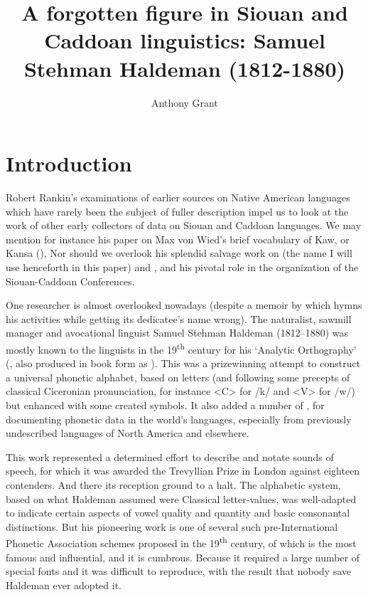 \documentclass[output=paper]{LSP/langsci}
\author{Anthony Grant}
\title{A forgotten figure in {Siouan} and {Caddoan} linguistics:  {Samuel Stehman Haldeman} (1812-1880)}
\begin{document}
\section{Introduction}

 
Robert Rankin's examinations of earlier sources on Native American languages which have rarely been the subject of fuller description impel us to look at the work of other early collectors of data on Siouan and Caddoan languages. We may mention for instance his paper on Max von Wied's \citeyearpar{Maximilian18391841} brief vocabulary of Kaw,  or Kansa  (\citealt{Rankin1994}), Nor should we overlook his splendid salvage work on  (the name I will use henceforth in this paper) and , and his pivotal role in the organization of the Siouan-Caddoan Conferences.
 

One researcher is almost overlooked nowadays (despite a memoir by \citealt{Lesley1881} which hymns his activities while getting its dedicatee's name wrong). The naturalist, sawmill manager and avocational linguist Samuel Stehman Haldeman (1812--1880)  was mostly known to the linguists in the 19\textsuperscript{th} century for his `Analytic Orthography' (\citealt{Haldeman1859}, also produced in book form as \citealt{Haldeman1860}). This was a prizewinning attempt to construct a  universal phonetic alphabet, based on  letters (and following some precepts of classical Ciceronian  pronunciation, for instance <C> for /k/ and <V> for /w/) but enhanced with some created symbols. It also added a number of , for documenting phonetic data in the world's languages, especially from previously undescribed languages of North America and elsewhere.

This work represented a determined effort to describe and notate%
sounds of speech,
for which it was awarded the Trevyllian Prize in London against eighteen contenders. And there its reception ground to a halt. The alphabetic system, based on what Haldeman assumed were Classical  letter-values, was well-adapted to indicate certain aspects of vowel quality and quantity and basic consonantal distinctions. But his pioneering work is one of several such pre-International Phonetic Association  schemes proposed in the 19\textsuperscript{th} century, of which \citet{Lepsius1863} is the most famous and influential, and it is cumbrous.  Because it required a large number of special fonts and  it was difficult to reproduce, with the result that nobody save Haldeman ever adopted it.    
\end{document}
